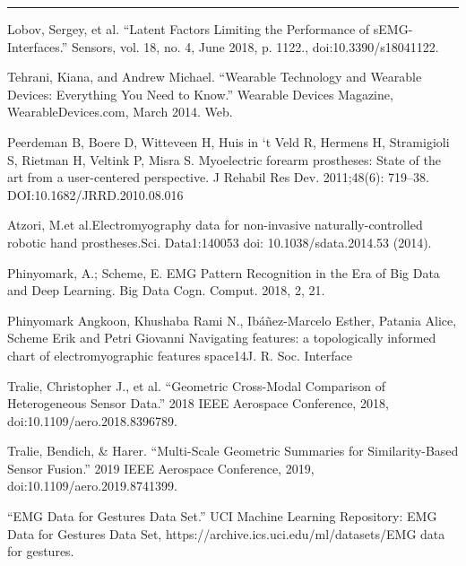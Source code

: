 \documentclass[11pt]{article}
\begin{document}
\begin{center}
\noindent\rule{16cm}{0.4pt}
\end{center}


\begin{thebibliography}{5}

 Lobov, Sergey, et al. “Latent Factors Limiting the Performance of sEMG-Interfaces.” Sensors, vol. 18, no. 4, June 2018, p. 1122., doi:10.3390/s18041122.

 Tehrani, Kiana, and Andrew Michael. “Wearable Technology and Wearable Devices: Everything You Need to Know.” Wearable Devices Magazine, WearableDevices.com, March 2014. Web.

 Peerdeman  B,  Boere  D,  Witteveen  H,  Huis  in  ‘t  Veld  R,  Hermens H, Stramigioli S, Rietman H, Veltink P, Misra S. Myoelectric  forearm  prostheses:  State  of  the  art  from  a  user-centered perspective. J Rehabil Res Dev. 2011;48(6): 719–38. DOI:10.1682/JRRD.2010.08.016

 Atzori, M.et al.Electromyography data for non-invasive naturally-controlled robotic hand prostheses.Sci. Data1:140053 doi: 10.1038/sdata.2014.53 (2014).

 Phinyomark, A.; Scheme, E. EMG Pattern Recognition in the Era of Big Data and Deep Learning. Big Data Cogn. Comput. 2018, 2, 21. 

 Phinyomark Angkoon, Khushaba Rami N., Ibáñez-Marcelo Esther, Patania Alice, Scheme Erik and Petri Giovanni Navigating features: a topologically informed chart of electromyographic features space14J. R. Soc. Interface

 Tralie, Christopher J., et al. “Geometric Cross-Modal Comparison of Heterogeneous Sensor Data.” 2018 IEEE Aerospace Conference, 2018, doi:10.1109/aero.2018.8396789.

 Tralie, Bendich, \& Harer. “Multi-Scale Geometric Summaries for Similarity-Based Sensor Fusion.” 2019 IEEE Aerospace Conference, 2019, doi:10.1109/aero.2019.8741399.

 “EMG Data for Gestures Data Set.” UCI Machine Learning Repository: EMG Data for Gestures Data Set, https://archive.ics.uci.edu/ml/datasets/EMG data for gestures.

\end{thebibliography}
  
\end{document}

